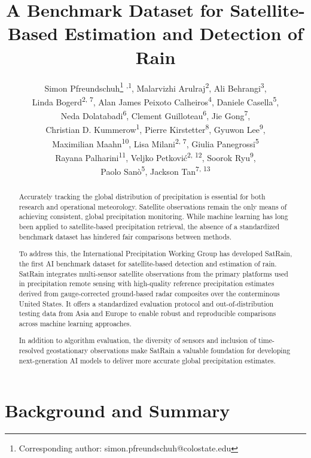 \documentclass[11pt]{article}
\title{A Benchmark Dataset for Satellite-Based Estimation and Detection of Rain}
\author{%
	  Simon Pfreundschuh\thanks{Corresponding author: simon.pfreundschuh@colostate.edu} \textsuperscript{,1}, %
	Malarvizhi Arulraj\textsuperscript{2}, %
	Ali Behrangi\textsuperscript{3},\\ %
	Linda Bogerd\textsuperscript{2, 7},%
	Alan James Peixoto Calheiros\textsuperscript{4}, %
	Daniele Casella\textsuperscript{5},\\ %
	Neda Dolatabadi\textsuperscript{6}, %
	Clement Guilloteau\textsuperscript{6}, %
	Jie Gong\textsuperscript{7},\\ %
	Christian D. Kummerow\textsuperscript{1}, %
	Pierre Kirstetter\textsuperscript{8},  %
	Gyuwon Lee\textsuperscript{9},\\ %
	Maximilian Maahn\textsuperscript{10}, %
	Lisa Milani\textsuperscript{2, 7}, %
  Giulia Panegrossi\textsuperscript{5} \\ %
	Rayana Palharini\textsuperscript{11},%
	Veljko Petković\textsuperscript{2, 12}, %
	Soorok Ryu\textsuperscript{9},\\ %
	Paolo Sanò\textsuperscript{5}, %
	Jackson Tan\textsuperscript{7, 13}
}
\date{
  \begin{flushleft}
	\footnotesize
	\textsuperscript{1} Department of Atmospheric Science, Colorado State University \\
	\textsuperscript{2} Earth System Science Interdisciplinary Center, University of Maryland  \\
	\textsuperscript{3} Department of Hydrology and Atmospheric Sciences, University of Arizona\\
	\textsuperscript{4} Instituto Nacional de Pesquisas Espaciais \\
	\textsuperscript{5} Institute of Atmospheric Sciences and Climate, Italian National Research Council \\
	\textsuperscript{6} Department of Civil and Environmental Engineering, University of California Irvine \\
	\textsuperscript{7} NASA Goddard Space Flight Center \\
  \textsuperscript{8} School of Meteorology \& School of Civil Engineering and Environmental Science, University of Oklahoma \\
	\textsuperscript{9} Department of Atmospheric Sciences, Kyungpook National University \\
	\textsuperscript{10} Institute for Meteorology, Leipzig University \\
  \textsuperscript{11} Departamento de Prevención de Riegos y Medio Ambiente, Universidad Tecnológica Metropolitana, \\
	\textsuperscript{12} Cooperative Institute for Satellite Earth System Studies, University of Maryland  \\
  \textsuperscript{13} University of Maryland, Baltimore County \\
	\end{flushleft}
}
\begin{document}
\maketitle

\linenumbers

\begin{abstract}

Accurately tracking the global distribution of precipitation is essential for
both research and operational meteorology. Satellite observations remain the
only means of achieving consistent, global precipitation monitoring. While
machine learning has long been applied to satellite-based precipitation
retrieval, the absence of a standardized benchmark dataset has hindered fair
comparisons between methods.

To address this, the International Precipitation Working Group has developed
SatRain, the first AI benchmark dataset for satellite-based detection and
estimation of rain. SatRain integrates multi-sensor satellite observations from
the primary platforms used in precipitation remote sensing with high-quality
reference precipitation estimates derived from gauge-corrected ground-based
radar composites over the conterminous United States. It offers a standardized
evaluation protocol and out-of-distribution testing data from Asia and Europe to
enable robust and reproducible comparisons across machine learning approaches.

In addition to algorithm evaluation, the diversity of sensors and inclusion of
time-resolved geostationary observations make SatRain a valuable foundation for
developing next-generation AI models to deliver more accurate global
precipitation estimates.

\end{abstract}

\section{Background and Summary}
\end{document}
